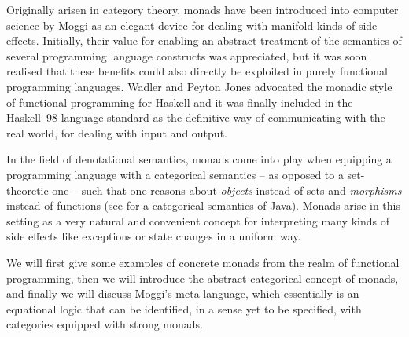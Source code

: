 Originally arisen in category theory, monads have been introduced into computer
science by Moggi \cite{Moggi91} as an elegant device for dealing with manifold
kinds of side effects. Initially, their value for enabling an abstract treatment
of the semantics of several programming language constructs was appreciated, but
it was soon realised that these benefits could also directly be exploited in
purely functional programming languages. Wadler and Peyton Jones \cite{Wadler97,
  JonesWadler93} advocated the monadic style of functional programming for
Haskell and it was finally included in the Haskell~98 language standard as the
definitive way of communicating with the real world, \IE for dealing with input
and output.

In the field of denotational semantics, monads come into play when equipping a
programming language with a categorical semantics -- as opposed to a
set-theoretic one -- such that one reasons about \emph{objects} instead of sets
and \emph{morphisms} instead of functions (see \cite{JacobsPoll00} for a
categorical semantics of Java). Monads arise in this setting as a very natural
and convenient concept for interpreting many kinds of side effects like
exceptions or state changes in a uniform way.


We will first give some examples of concrete monads from the realm of functional
programming, then we will introduce the abstract categorical concept of monads,
and finally we will discuss Moggi's meta-language, which essentially is an
equational logic that can be identified, in a sense yet to be specified, with
categories equipped with strong monads.


